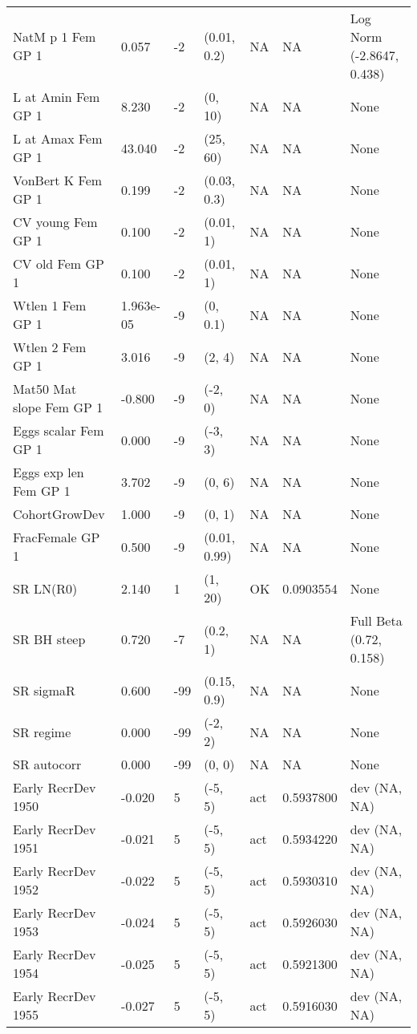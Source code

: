 \documentclass[11pt,
  english,
  a4paper,
]{article}
\begin{document}
\begin{landscape}
\begin{longtable}[t]{>{\raggedright\arraybackslash}p{6cm}lllll>{\raggedright\arraybackslash}p{4cm}}
\endfoot
\bottomrule
\endlastfoot
NatM p 1 Fem GP 1 & 0.057 & -2 & (0.01, 0.2) & NA & NA & Log Norm (-2.8647, 0.438)\\
L at Amin Fem GP 1 & 8.230 & -2 & (0, 10) & NA & NA & None\\
L at Amax Fem GP 1 & 43.040 & -2 & (25, 60) & NA & NA & None\\
VonBert K Fem GP 1 & 0.199 & -2 & (0.03, 0.3) & NA & NA & None\\
CV young Fem GP 1 & 0.100 & -2 & (0.01, 1) & NA & NA & None\\
CV old Fem GP 1 & 0.100 & -2 & (0.01, 1) & NA & NA & None\\
Wtlen 1 Fem GP 1 & 1.963e-05 & -9 & (0, 0.1) & NA & NA & None\\
Wtlen 2 Fem GP 1 & 3.016 & -9 & (2, 4) & NA & NA & None\\
Mat50%
Mat slope Fem GP 1 & -0.800 & -9 & (-2, 0) & NA & NA & None\\
Eggs scalar Fem GP 1 & 0.000 & -9 & (-3, 3) & NA & NA & None\\
Eggs exp len Fem GP 1 & 3.702 & -9 & (0, 6) & NA & NA & None\\
CohortGrowDev & 1.000 & -9 & (0, 1) & NA & NA & None\\
FracFemale GP 1 & 0.500 & -9 & (0.01, 0.99) & NA & NA & None\\
SR LN(R0) & 2.140 & 1 & (1, 20) & OK & 0.0903554 & None\\
SR BH steep & 0.720 & -7 & (0.2, 1) & NA & NA & Full Beta (0.72, 0.158)\\
SR sigmaR & 0.600 & -99 & (0.15, 0.9) & NA & NA & None\\
SR regime & 0.000 & -99 & (-2, 2) & NA & NA & None\\
SR autocorr & 0.000 & -99 & (0, 0) & NA & NA & None\\
Early RecrDev 1950 & -0.020 & 5 & (-5, 5) & act & 0.5937800 & dev (NA, NA)\\
Early RecrDev 1951 & -0.021 & 5 & (-5, 5) & act & 0.5934220 & dev (NA, NA)\\
Early RecrDev 1952 & -0.022 & 5 & (-5, 5) & act & 0.5930310 & dev (NA, NA)\\
Early RecrDev 1953 & -0.024 & 5 & (-5, 5) & act & 0.5926030 & dev (NA, NA)\\
Early RecrDev 1954 & -0.025 & 5 & (-5, 5) & act & 0.5921300 & dev (NA, NA)\\
Early RecrDev 1955 & -0.027 & 5 & (-5, 5) & act & 0.5916030 & dev (NA, NA)\\

\end{longtable}
\end{landscape}
\end{document}
